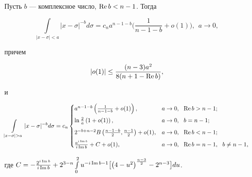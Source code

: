 \begin{cors}


Пусть $b$ --- комплексное число, $\operatorname{Re} b<n-1$. Тогда


$$


\int\limits_{|x-\sigma|<a}


|x-\sigma|^{-b}d\sigma =c_n a^{n-1-b}\bigg(\frac{1}{n-1-b}+o(1)\bigg),\ \


a\to 0,


$$


причем


$$


|o(1)|\le \frac{(n-3)a^2}{8(n+1-\re b)},


$$


и


$$


\int\limits_{|x-\sigma|>a}


|x-\sigma|^{-b}d\sigma =c_n


\begin{cases}


a^{n-1-b}\left(\frac{1}{n-1-b}+o(1)\right), & a\to 0,


\ \ \re b > n-1; \\[2mm]


%


\ln \frac{2}{a}\left(1+o(1)\right), & a\to 0, \ \ b = n-1;\\[2mm]


%


2^{-b+n-2}B\left(\frac{n-1-b}{2},\frac{n-1}{2}\right)+o(1), & a\to 0,


\ \ \re b <n-1; \\[2mm]


%


\frac{a^{i\im b}}{i\im b}+C+o(1), & a\to 0,


\ \ \re b = n-1, \ \ b \ne n-1,


\end{cases}


$$


где $C=-\frac{2^{i\im b}}{i\im b}+


2^{3-n}\int\limits_{0}^2 u^{-i\im b-1}\big[\big(4-u^2\big)^{\frac{n-


3}{2}}-2^{n-3}\big]du$.


\end{cors}





